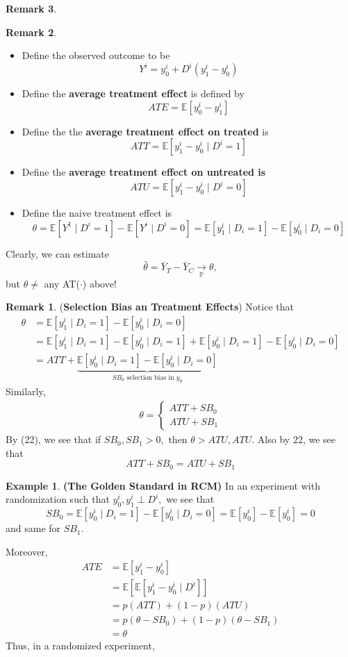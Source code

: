 \documentclass[10pt, oneside]{article}
\newcommand{\bbP}{\mathbb{P}}
\newcommand{\bbE}{\mathbb{E}}
\theoremstyle{definition}
\newtheorem{exmp}{Example}[section]
\newtheorem{rem}{Remark}
\begin{document}
\begin{rem}
\begin{rem}
\begin{itemize}
        \item Define the observed outcome to be 
        \[Y^i = y^i_0 + D^i(y^i_1 - y^i_0)\]
        \item Define the \textbf{average treatment effect} is defined by 
    \[ATE= \bbE[y^i_0 - y^i_1]\]
    \item Define the the \textbf{average treatment effect on treated} is 
    \[ATT = \bbE[y^i_1 - y^i_0 \mid D^i = 1]\]
    \item Define the \textbf{average treatment effect on untreated is}
    \[ATU = \bbE[y^i_1 - y^i_0 \mid D^i = 0]\]
    \item Define the 
    naive treatment effect is 
    \[\theta = \bbE[Y^1 \mid D^i = 1 ] - \bbE[Y^i \mid D^i = 0] = \bbE[y^i_1 \mid D_i = 1] - \bbE[y^i_0 \mid D_i = 0]\]
    \end{itemize}
Clearly, we can estimate 
\[\hat\theta = \bar Y_T - \bar Y_C\xrightarrow[\bbP]{}\theta,\] but $\theta \neq $ any AT($\cdot$) above!

\begin{rem}
    (\textbf{Selection Bias an Treatment Effects})
Notice that 
\begin{align*}
    \theta &= \bbE[y^i_1 \mid D_i = 1] - \bbE[y^i_0 \mid D_i = 0]\\
    &= \bbE[y^i_1 \mid D_i = 1] - \bbE[y^i_0 \mid D_i = 1] + \bbE[y^i_0 \mid D_i = 1] - \bbE[y^i_0 \mid D_i = 0]\\
    &= ATT + \underbrace{\bbE[y^i_0 \mid D_i = 1] - \bbE[y^i_0 \mid D_i = 0]}_{SB_0\text{ selection bias in $y_0$}}
\end{align*} Similarly, 
\begin{align}
\boxed{\theta = \begin{cases}
    ATT + SB_0\\
    ATU + SB_1
\end{cases}}    
\end{align}
By (22), we see that if $SB_0, SB_1>0,$ then $\theta >ATU, ATU.$ Also by 22, we see that 
\[ATT + SB_0 = ATU + SB_1\]
\begin{exmp}
\textbf{(The Golden Standard in RCM)}
    In an experiment with randomization such that $y_0^i, y_1^i \perp D^i,$ we see that 
    \[SB_0 = \bbE[y^i_0 \mid D_i = 1] - \bbE[y^i_0 \mid D_i = 0] = \bbE[y_0^i] - \bbE[y_0^i] = 0\] and same for $SB_1.$

    Moreover, 
    \begin{align*}
    ATE &= \bbE[y_1^i - y_0^i]\\
    &= \bbE[\bbE[y_1^i - y_0^i \mid D^i]]\\
    &= p (ATT) + (1-p)(ATU)\\
    &= p(\theta - SB_0)  + (1-p)(\theta - SB_1)\\
    &= \theta
\end{align*}
Thus, in a randomized experiment, 
\end{exmp} 
\end{rem}
\end{rem}
\end{rem}
\end{document}
